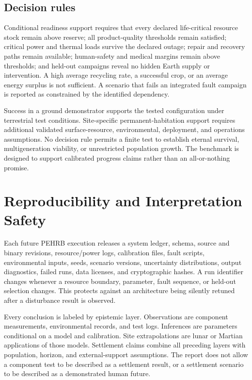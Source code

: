 \documentclass[10pt,conference]{IEEEtran}
\begin{document}
\subsection{Decision rules}

Conditional readiness support requires that every declared life-critical resource stock remain above reserve; all product-quality thresholds remain satisfied; critical power and thermal loads survive the declared outage; repair and recovery paths remain available; human-safety and medical margins remain above thresholds; and held-out campaigns reveal no hidden Earth supply or intervention. A high average recycling rate, a successful crop, or an average energy surplus is not sufficient. A scenario that fails an integrated fault campaign is reported as constrained by the identified dependency.

Success in a ground demonstrator supports the tested configuration under terrestrial test conditions. Site-specific permanent-habitation support requires additional validated surface-resource, environmental, deployment, and operations assumptions. No decision rule permits a finite test to establish eternal survival, multigeneration viability, or unrestricted population growth. The benchmark is designed to support calibrated progress claims rather than an all-or-nothing promise.

\section{Reproducibility and Interpretation Safety}
\label{sec:reproducibility}

Each future PEHRB execution releases a system ledger, schema, source and binary revisions, resource/power logs, calibration files, fault scripts, environmental inputs, seeds, scenario versions, uncertainty distributions, output diagnostics, failed runs, data licenses, and cryptographic hashes. A run identifier changes whenever a resource boundary, parameter, fault sequence, or held-out selection changes. This protects against an architecture being silently retuned after a disturbance result is observed.

Every conclusion is labeled by epistemic layer. Observations are component measurements, environmental records, and test logs. Inferences are parameters conditional on a model and calibration. Site extrapolations are lunar or Martian applications of those models. Settlement claims combine all preceding layers with population, horizon, and external-support assumptions. The report does not allow a component test to be described as a settlement result, or a settlement scenario to be described as a demonstrated human future.
\end{document}
